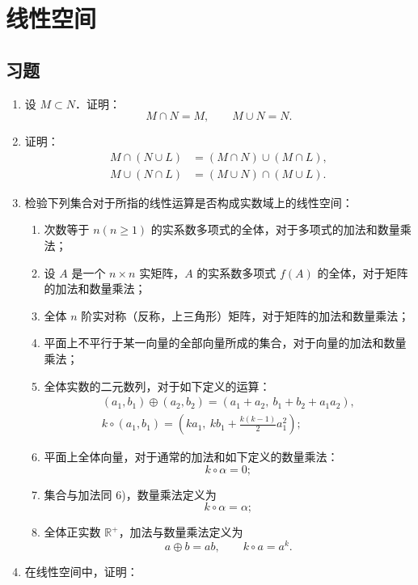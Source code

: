 \chapter{线性空间}

\section{习题}

\begin{enumerate}
  \item 设 $M\subset N$．证明：
  \[
    M\cap N=M,\qquad M\cup N=N.
  \]
  \ansproof
  \item 证明：
  \begin{align*}
    M\cap(N\cup L)&=(M\cap N)\cup(M\cap L),\\
    M\cup(N\cap L)&=(M\cup N)\cap(M\cup L).
  \end{align*}
  \ansproof
  \item 检验下列集合对于所指的线性运算是否构成实数域上的线性空间：
  \begin{enumerate}
    \item 次数等于 $n(n\ge 1)$ 的实系数多项式的全体，对于多项式的加法和数量乘法；
  \anssub
    \item 设 $A$ 是一个 $n\times n$ 实矩阵，$A$ 的实系数多项式 $f(A)$ 的全体，对于矩阵的加法和数量乘法；
  \anssub
    \item 全体 $n$ 阶实对称（反称，上三角形）矩阵，对于矩阵的加法和数量乘法；
  \anssub
    \item 平面上不平行于某一向量的全部向量所成的集合，对于向量的加法和数量乘法；
  \anssub
    \item 全体实数的二元数列，对于如下定义的运算：
    \[
    \begin{gathered}
      (a_1,b_1)\oplus(a_2,b_2)=(a_1+a_2,\ b_1+b_2+a_1a_2),\\
      k\circ(a_1,b_1)=\left(ka_1,\ kb_1+\frac{k(k-1)}{2}a_1^2\right);
    \end{gathered}
    \]
  \anssub
    \item 平面上全体向量，对于通常的加法和如下定义的数量乘法：
    \[
      k\circ\alpha=0;
    \]
  \anssub
    \item 集合与加法同 6)，数量乘法定义为
    \[
      k\circ\alpha=\alpha;
    \]
  \anssub
    \item 全体正实数 $\mathbb{R}^+$，加法与数量乘法定义为
    \[
      a\oplus b=ab,\qquad k\circ a=a^k.
    \]
  \anssub
  \end{enumerate}
  \item 在线性空间中，证明：

\end{enumerate}
